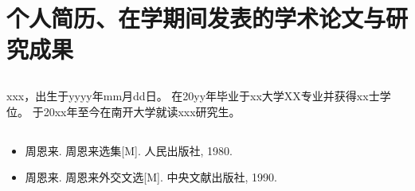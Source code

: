 

\chapter*{个人简历、在学期间发表的学术论文与研究成果}

\section*{}

{
\zihaowu
\setlength{\baselineskip}{16pt}
\setlength{\parskip}{0pt}

xxx，出生于yyyy年mm月dd日。
在20yy年毕业于xx大学XX专业并获得xx士学位。
于20xx年至今在南开大学就读xxx研究生。

}

\section*{}


{
\zihaowu
\setlength{\baselineskip}{16pt}
\setlength{\parskip}{0pt}

\begin{itemize}
	\item 周恩来. 周恩来选集[M]. 人民出版社, 1980.
	\item 周恩来. 周恩来外交文选[M]. 中央文献出版社, 1990.
\end{itemize}

}






